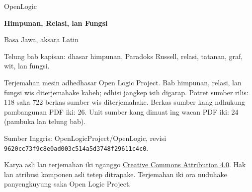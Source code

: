 \documentclass[11pt,openany,a4paper]{memoir}
\begin{document}
\begin{titlingpage}
\raggedright
{\sffamily\Large OpenLogic \par}
\vspace{18mm}
{\sffamily\bfseries\Huge Himpunan, Relasi, lan Fungsi\par}
\vspace{6mm}
{\Large Basa Jawa, aksara Latin\par}
\vspace{18mm}
{\large Telung bab kapisan: dhasar himpunan, Paradoks Russell,
relasi, tatanan, graf, wit, lan fungsi.\par}
\vfill
Terjemahan mesin adhedhasar Open Logic Project.
Bab himpunan, relasi, lan fungsi wis diterjemahake kabeh; edhisi jangkep isih digarap.
Potret sumber rilis: 118 saka 722 berkas sumber wis diterjemahake.
Berkas sumber kang ndhukung pambangunan PDF iki: 26.
Unit sumber kang dimuat ing wacan PDF iki: 24 (pambuka lan telung bab).
\par\medskip
Sumber Inggris: OpenLogicProject/OpenLogic, revisi
\texttt{9620cc73f9c8e0ad003c514a5d3748f29611c4c0}.
\par\medskip
Karya asli lan terjemahan iki nganggo
\href{https://creativecommons.org/licenses/by/4.0/}{Creative Commons Attribution 4.0}.
Hak lan atribusi komponen asli tetep ditrapake.
Terjemahan iki ora nuduhake panyengkuyung saka Open Logic Project.
\end{titlingpage}
\pagestyle{plain}

\clearpage
\tableofcontents*
{}



\end{document}

